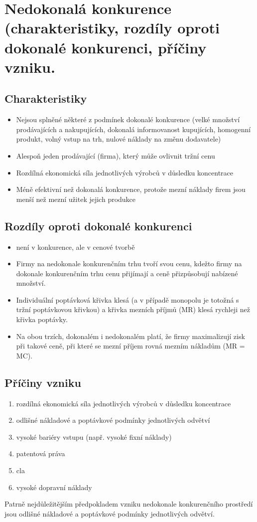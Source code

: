 \clearpage
\section{Nedokonalá konkurence (charakteristiky, rozdíly oproti dokonalé konkurenci, příčiny
vzniku.}

\subsection{Charakteristiky}
\begin{itemize}
    \item Nejsou splněné některé z podmínek dokonalé konkurence (velké množství 
    prodávajících a nakupujících, dokonalá informovanost kupujících, homogenní produkt,
    volný vstup na trh, nulové náklady na změnu dodavatele)
    \item Alespoň jeden prodávající (firma), který může ovlivnit tržní cenu
    \item Rozdílná ekonomická síla jednotlivých výrobců v důsledku koncentrace
    \item Méně efektivní než dokonalá konkurence, protože mezní náklady firem jsou menší 
    než mezní užitek jejich produkce
\end{itemize}

\subsection{Rozdíly oproti dokonalé konkurenci}
\begin{itemize}
    \item není v  konkurence, ale v cenové tvorbě
    \item Firmy na nedokonale konkurenčním trhu tvoří svou cenu, kdežto firmy na dokonale
    konkurenčním trhu cenu přijímají a ceně přizpůsobují nabízené množství.
    \item Individuální poptávková křivka klesá (a v případě monopolu je totožná s tržní 
    poptávkovou křivkou) a křivka mezních příjmů (MR) klesá rychleji než křivka poptávky.
    \item Na obou trzích, dokonalém i nedokonalém platí, že firmy maximalizují zisk při takové
    ceně, při které se mezní příjem rovná mezním nákladům (MR = MC).
\end{itemize}

\subsection{Příčiny vzniku}
\begin{enumerate}
    \item rozdílná ekonomická síla jednotlivých výrobců v důsledku koncentrace
    \item odlišné nákladové a poptávkové podmínky jednotlivých odvětví
    \item vysoké bariéry vstupu (např. vysoké fixní náklady)
    \item patentová práva
    \item cla
    \item vysoké dopravní náklady
\end{enumerate}
Patrně nejdůležitějším předpokladem vzniku nedokonale konkurenčního prostředí jsou odlišné
nákladové a poptávkové podmínky jednotlivých odvětví.